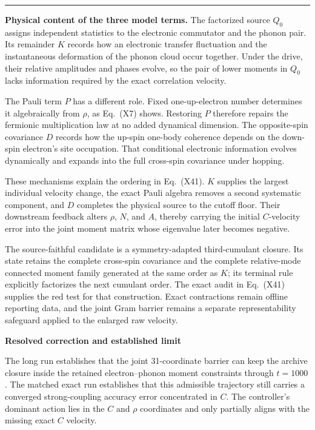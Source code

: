 \documentclass[10pt,letterpaper,twocolumn]{article}
\newcommand{\conceptbreak}{%
  \par\medskip\noindent
  {\color{black!30}\rule{\columnwidth}{0.35pt}}%
  \par\medskip
}
\begin{document}
\conceptbreak
\textbf{Physical content of the three model terms.}
The factorized source \(Q_0\) assigns independent statistics to the
electronic commutator and the phonon pair.  Its remainder \(K\) records how
an electronic transfer fluctuation and the instantaneous deformation of the
phonon cloud occur together.  Under the drive, their relative amplitudes and
phases evolve, so the pair of lower moments in \(Q_0\) lacks information
required by the exact correlation velocity.

The Pauli term \(P\) has a different role.  Fixed one-up-electron number
determines it algebraically from \(\rho\), as Eq.~(X7) shows.  Restoring \(P\)
therefore repairs the fermionic multiplication law at no added dynamical
dimension.  The opposite-spin covariance \(D\) records how the up-spin
one-body coherence depends on the down-spin electron's site occupation.
That conditional electronic information evolves dynamically and expands into
the full cross-spin covariance under hopping.

These mechanisms explain the ordering in Eq.~(X41).  \(K\) supplies the
largest individual velocity change, the exact Pauli algebra removes a second
systematic component, and \(D\) completes the physical source to the cutoff
floor.  Their downstream feedback alters \(\rho\), \(N\), and \(A\), thereby
carrying the initial \(C\)-velocity error into the joint moment matrix whose
eigenvalue later becomes negative.

The source-faithful candidate is a symmetry-adapted third-cumulant closure.
Its state retains the complete cross-spin covariance and the complete
relative-mode connected moment family generated at the same order as \(K\);
its terminal rule explicitly factorizes the next cumulant order.  The exact
audit in Eq.~(X41) supplies the red test for that construction.  Exact
contractions remain offline reporting data, and the joint Gram barrier remains
a separate representability safeguard applied to the enlarged raw velocity.

\newpage
\par\smallskip
\noindent{\color{green}\rule{\columnwidth}{1.1pt}}\par\vspace{-1pt}
{\small
\noindent\textbf{\color{green}Resolved correction and established limit}
\par\smallskip\color{black}
The long run establishes that the joint 31-coordinate barrier can keep the
archive closure inside the retained electron--phonon moment constraints through
\(t=1000\).  The matched exact run establishes that this admissible trajectory
still carries a converged strong-coupling accuracy error concentrated in
\(C\).  The controller's dominant action lies in the \(C\) and \(\rho\)
coordinates and only partially aligns with the missing exact \(C\) velocity.
\par}
\vspace{1pt}\noindent{\color{navy!35}\rule{\columnwidth}{0.35pt}}
\end{document}
